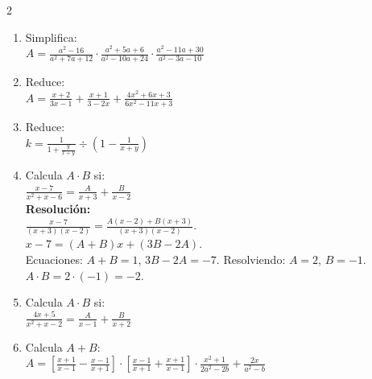 \documentclass[10pt]{article}
\begin{document}
\begin{multicols}{2}
\begin{enumerate}[label=\textbf{\arabic*.}, itemsep=0.4cm]
			\item Simplifica: \\
			$A = \frac{a^2 - 16}{a^2 + 7a + 12} \cdot \frac{a^2 + 5a + 6}{a^2 - 10a + 24} \cdot \frac{a^2 - 11a + 30}{a^2 - 3a - 10}$

			\item Reduce: \\
			$A = \frac{x + 2}{3x - 1} + \frac{x + 1}{3 - 2x} + \frac{4x^2 + 6x + 3}{6x^2 - 11x + 3}$

			\item Reduce: \\
			$k = \frac{1}{1 + \frac{y}{x + y}} \div \left(1 - \frac{1}{x + y}\right)$

			\item Calcula $A \cdot B$ si: \\
			$\frac{x - 7}{x^2 + x - 6} = \frac{A}{x + 3} + \frac{B}{x - 2}$ \\
			\textbf{Resolución:} \\
			$\frac{x - 7}{(x + 3)(x - 2)} = \frac{A(x - 2) + B(x + 3)}{(x + 3)(x - 2)}$. \\
			$x - 7 = (A + B)x + (3B - 2A)$. \\
			Ecuaciones: $A + B = 1$, $3B - 2A = -7$. Resolviendo: $A = 2$, $B = -1$. \\
			$A \cdot B = 2 \cdot (-1) = -2$.

			\item Calcula $A \cdot B$ si: \\
			$\frac{4x + 5}{x^2 + x - 2} = \frac{A}{x - 1} + \frac{B}{x + 2}$

			\item Calcula $A + B$: \\
			$A = \left[ \frac{x + 1}{x - 1} - \frac{x - 1}{x + 1} \right] \cdot \left[ \frac{x - 1}{x + 1} + \frac{x + 1}{x - 1} \right] \cdot \frac{x^2 + 1}{2a^2 - 2b} + \frac{2x}{a^2 - b}$


		\end{enumerate}

\end{multicols}
\end{document}
